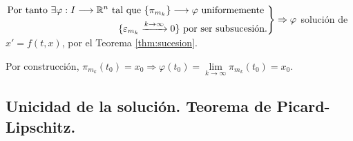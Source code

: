 \documentclass[11pt, a4paper,twoside]{article}
\makeatletter
\theoremstyle{theorem-style}  %
\renewenvironment{proof}[1][\proofname]{\par
	\pushQED{\qed}%
	\normalfont \topsep6\p@\@plus6\p@\relax
	\list{}{%
		\settowidth{\leftmargin}{\quad:\hskip\labelsep}%
		\setlength{\labelwidth}{0pt}%
		\setlength{\itemindent}{-\leftmargin}%
	}%
	\item[\hskip\labelsep\itshape#1\@addpunct{:}]\ignorespaces
}{%
	\popQED\endlist\@endpefalse
}
\theoremstyle{definition-style}
\theoremstyle{example-style}
\newenvironment{rcases}
{\left.\begin{aligned}}
	{\end{aligned}\right\rbrace}
\makeatother
\begin{document}
\begin{proof}
	$ \begin{rcases}
		\text{Por tanto } \exists \varphi: I\longrightarrow \mathbb{R}^n \text{ tal que } \{\pi_{m_k} \}\longrightarrow \varphi \text{ uniformemente }\\
		\{\varepsilon_{m_k}\xrightarrow{k\to \infty}0  \} \text{ por ser subsucesión.}
	\end{rcases} \Rightarrow \varphi$ solución de $ x'=f(t,x) $, por el Teorema \ref{thm:sucesion}.
	
	Por construcción, $ \pi_{m_k}(t_0)=x_0 \Rightarrow \varphi(t_0) = \lim\limits_{k\to \infty}\pi_{m_k}(t_0)=x_0$.
\end{proof}

\subsection{Unicidad de la solución. Teorema de Picard-Lipschitz.}
\end{document}
